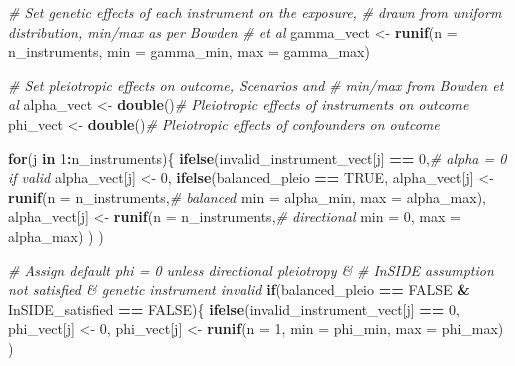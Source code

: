 \documentclass[
]{article}
\newenvironment{Shaded}{\begin{snugshade}}{\end{snugshade}}
\newcommand{\AttributeTok}[1]{\textcolor[rgb]{0.13,0.29,0.53}{#1}}
\newcommand{\CommentTok}[1]{\textcolor[rgb]{0.56,0.35,0.01}{\textit{#1}}}
\newcommand{\ConstantTok}[1]{\textcolor[rgb]{0.56,0.35,0.01}{#1}}
\newcommand{\ControlFlowTok}[1]{\textcolor[rgb]{0.13,0.29,0.53}{\textbf{#1}}}
\newcommand{\DecValTok}[1]{\textcolor[rgb]{0.00,0.00,0.81}{#1}}
\newcommand{\FunctionTok}[1]{\textcolor[rgb]{0.13,0.29,0.53}{\textbf{#1}}}
\newcommand{\NormalTok}[1]{#1}
\newcommand{\OtherTok}[1]{\textcolor[rgb]{0.56,0.35,0.01}{#1}}
\newcommand{\SpecialCharTok}[1]{\textcolor[rgb]{0.81,0.36,0.00}{\textbf{#1}}}
\begin{document}
\begin{Shaded}
\begin{Highlighting}[]
    \CommentTok{\# Set genetic effects of each instrument on the exposure,}
    \CommentTok{\# drawn from uniform distribution, min/max as per Bowden}
    \CommentTok{\# et al}
\NormalTok{     gamma\_vect }\OtherTok{\textless{}{-}} \FunctionTok{runif}\NormalTok{(}\AttributeTok{n =}\NormalTok{ n\_instruments,}
                         \AttributeTok{min =}\NormalTok{ gamma\_min,}
                         \AttributeTok{max =}\NormalTok{ gamma\_max)}

    \CommentTok{\# Set pleiotropic effects on outcome, Scenarios and}
    \CommentTok{\# min/max from Bowden et al}
\NormalTok{     alpha\_vect }\OtherTok{\textless{}{-}} \FunctionTok{double}\NormalTok{()}\CommentTok{\# Pleiotropic effects of instruments on outcome}
\NormalTok{     phi\_vect }\OtherTok{\textless{}{-}} \FunctionTok{double}\NormalTok{()}\CommentTok{\# Pleiotropic effects of confounders on outcome}

     \ControlFlowTok{for}\NormalTok{(j }\ControlFlowTok{in} \DecValTok{1}\SpecialCharTok{:}\NormalTok{n\_instruments)\{}
       \FunctionTok{ifelse}\NormalTok{(invalid\_instrument\_vect[j] }\SpecialCharTok{==} \DecValTok{0}\NormalTok{,}\CommentTok{\# alpha = 0 if valid}
\NormalTok{              alpha\_vect[j] }\OtherTok{\textless{}{-}} \DecValTok{0}\NormalTok{,}
              \FunctionTok{ifelse}\NormalTok{(balanced\_pleio }\SpecialCharTok{==} \ConstantTok{TRUE}\NormalTok{,}
\NormalTok{                     alpha\_vect[j] }\OtherTok{\textless{}{-}} \FunctionTok{runif}\NormalTok{(}\AttributeTok{n =}\NormalTok{ n\_instruments,}\CommentTok{\# balanced}
                                            \AttributeTok{min =}\NormalTok{ alpha\_min,}
                                            \AttributeTok{max =}\NormalTok{ alpha\_max),}
\NormalTok{                     alpha\_vect[j] }\OtherTok{\textless{}{-}} \FunctionTok{runif}\NormalTok{(}\AttributeTok{n =}\NormalTok{ n\_instruments,}\CommentTok{\# directional}
                                            \AttributeTok{min =} \DecValTok{0}\NormalTok{,}
                                            \AttributeTok{max =}\NormalTok{ alpha\_max)}
\NormalTok{              )}
\NormalTok{       )}

      \CommentTok{\# Assign default phi = 0 unless directional pleiotropy \&}
      \CommentTok{\# InSIDE assumption not satisfied \& genetic instrument invalid}
       \ControlFlowTok{if}\NormalTok{(balanced\_pleio }\SpecialCharTok{==} \ConstantTok{FALSE} \SpecialCharTok{\&}\NormalTok{ InSIDE\_satisfied }\SpecialCharTok{==} \ConstantTok{FALSE}\NormalTok{)\{}
         \FunctionTok{ifelse}\NormalTok{(invalid\_instrument\_vect[j] }\SpecialCharTok{==} \DecValTok{0}\NormalTok{,}
\NormalTok{                phi\_vect[j] }\OtherTok{\textless{}{-}} \DecValTok{0}\NormalTok{,}
\NormalTok{                phi\_vect[j] }\OtherTok{\textless{}{-}} \FunctionTok{runif}\NormalTok{(}\AttributeTok{n =} \DecValTok{1}\NormalTok{,}
                                     \AttributeTok{min =}\NormalTok{ phi\_min,}
                                     \AttributeTok{max =}\NormalTok{ phi\_max)}
\NormalTok{         )}


\end{Highlighting}
\end{Shaded}
\end{document}
